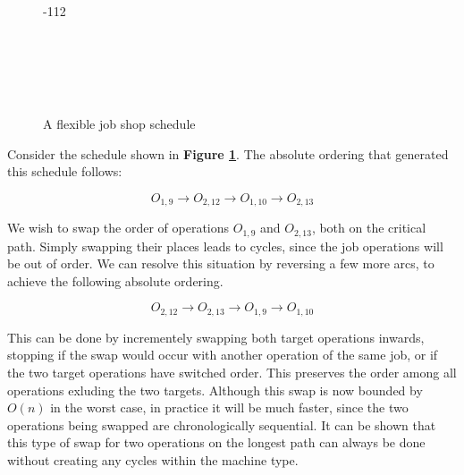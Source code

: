 \documentclass[a4paper,10pt]{article}
\begin{document}
\begin{figure}[h]
\centering
\begin{ganttchart}[
		x unit=0.7cm,
		y unit chart=0.7cm,
		canvas/.style={draw=none,fill=none},
		vgrid,
		vgrid={*1{draw=black!12}},
		inline,
		group/.style={draw=none,fill=none},
		bar top shift=0.1,
		bar height=0.8,
		y unit title=0.5cm,
		title/.style={draw=none,fill=none},
		include title in canvas=false,
	]{-1}{12}

	 \\

	 \\

	 \\

	 \\
	

\end{ganttchart}
\caption{A flexible job shop schedule}
\label{fig:sch-swap}
\end{figure}

Consider the schedule shown in \textbf{Figure \ref{fig:sch-swap}}. The absolute ordering that generated this schedule follows:

\[ O_{1,9} \rightarrow O_{2,12} \rightarrow O_{1,10} \rightarrow O_{2,13} \]

We wish to swap the order of operations $O_{1,9}$ and $O_{2,13}$, both on the critical path. Simply swapping their places leads to cycles, since the job operations will be out of order. We can resolve this situation by reversing a few more arcs, to achieve the following absolute ordering.

\[ O_{2,12} \rightarrow O_{2,13} \rightarrow O_{1,9} \rightarrow O_{1,10} \]

This can be done by incrementely swapping both target operations inwards, stopping if the swap would occur with another operation of the same job, or if the two target operations have switched order. This preserves the order among all operations exluding the two targets. Although this swap is now bounded by $O(n)$ in the worst case, in practice it will be much faster, since the two operations being swapped are chronologically sequential. It can be shown that this type of swap for two operations on the longest path can always be done without creating any cycles within the machine type.
\end{document}
